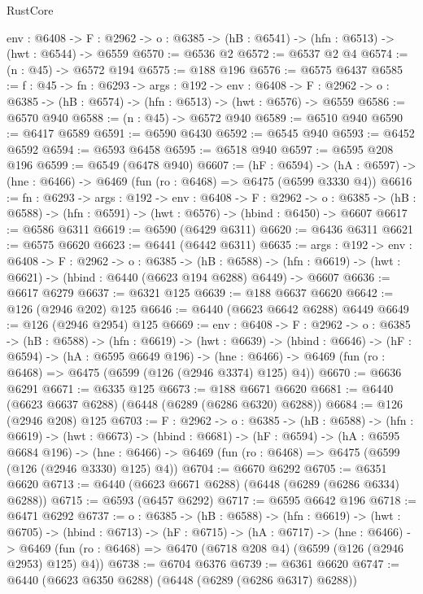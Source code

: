 \begin{lexlean}{RustCore}
\begin{coremodule}
  {env : @6408} ->
  {F : @2962} -> {o : @6385} -> (hB : @6541) -> (hfn : @6513) -> (hwt : @6544) -> @6559
@6570 := @6536 @2
@6572 := @6537 @2 @4
@6574 := (n : @45) -> @6572 @194
@6575 := @188 @196
@6576 := @6575 @6437
@6585 := {f : @45} ->
  {fn : @6293} ->
  {args : @192} ->
  {env : @6408} ->
  {F : @2962} -> {o : @6385} -> (hB : @6574) -> (hfn : @6513) -> (hwt : @6576) -> @6559
@6586 := @6570 @940
@6588 := (n : @45) -> @6572 @940
@6589 := @6510 @940
@6590 := @6417 @6589
@6591 := @6590 @6430
@6592 := @6545 @940
@6593 := @6452 @6592
@6594 := @6593 @6458
@6595 := @6518 @940
@6597 := @6595 @208 @196
@6599 := @6549 (@6478 @940)
@6607 := (hF : @6594) ->
  (hA : @6597) -> (hne : @6466) -> @6469 (fun (ro : @6468) => @6475 (@6599 @3330 @4))
@6616 := {fn : @6293} ->
  {args : @192} ->
  {env : @6408} ->
  {F : @2962} ->
  {o : @6385} -> (hB : @6588) -> (hfn : @6591) -> (hwt : @6576) -> (hbind : @6450) -> @6607
@6617 := @6586 @6311
@6619 := @6590 (@6429 @6311)
@6620 := @6436 @6311
@6621 := @6575 @6620
@6623 := @6441 (@6442 @6311)
@6635 := {args : @192} ->
  {env : @6408} ->
  {F : @2962} ->
  {o : @6385} ->
  (hB : @6588) ->
  (hfn : @6619) -> (hwt : @6621) -> (hbind : @6440 (@6623 @194 @6288) @6449) -> @6607
@6636 := @6617 @6279
@6637 := @6321 @125
@6639 := @188 @6637 @6620
@6642 := @126 (@2946 @202) @125
@6646 := @6440 (@6623 @6642 @6288) @6449
@6649 := @126 (@2946 @2954) @125
@6669 := {env : @6408} ->
  {F : @2962} ->
  {o : @6385} ->
  (hB : @6588) ->
  (hfn : @6619) ->
  (hwt : @6639) ->
  (hbind : @6646) ->
  (hF : @6594) ->
  (hA : @6595 @6649 @196) ->
  (hne : @6466) -> @6469 (fun (ro : @6468) => @6475 (@6599 (@126 (@2946 @3374) @125) @4))
@6670 := @6636 @6291
@6671 := @6335 @125
@6673 := @188 @6671 @6620
@6681 := @6440 (@6623 @6637 @6288) (@6448 (@6289 (@6286 @6320) @6288))
@6684 := @126 (@2946 @208) @125
@6703 := {F : @2962} ->
  {o : @6385} ->
  (hB : @6588) ->
  (hfn : @6619) ->
  (hwt : @6673) ->
  (hbind : @6681) ->
  (hF : @6594) ->
  (hA : @6595 @6684 @196) ->
  (hne : @6466) -> @6469 (fun (ro : @6468) => @6475 (@6599 (@126 (@2946 @3330) @125) @4))
@6704 := @6670 @6292
@6705 := @6351 @6620
@6713 := @6440 (@6623 @6671 @6288) (@6448 (@6289 (@6286 @6334) @6288))
@6715 := @6593 (@6457 @6292)
@6717 := @6595 @6642 @196
@6718 := @6471 @6292
@6737 := {o : @6385} ->
  (hB : @6588) ->
  (hfn : @6619) ->
  (hwt : @6705) ->
  (hbind : @6713) ->
  (hF : @6715) ->
  (hA : @6717) ->
  (hne : @6466) ->
  @6469 (fun (ro : @6468) => @6470 (@6718 @208 @4) (@6599 (@126 (@2946 @2953) @125) @4))
@6738 := @6704 @6376
@6739 := @6361 @6620
@6747 := @6440 (@6623 @6350 @6288) (@6448 (@6289 (@6286 @6317) @6288))

\end{coremodule}
\end{lexlean}
